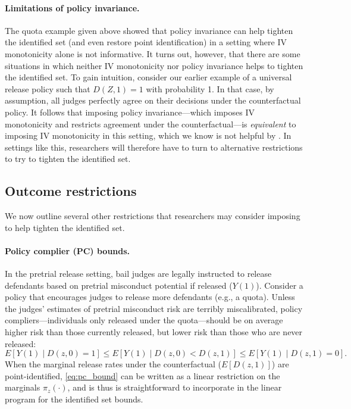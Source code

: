 \documentclass[12pt]{article}%
\theoremstyle{definition}
\newcommand\1{\operatorname{I}\indicatorfence}
\begin{document}
\paragraph{Limitations of policy invariance.} The quota
example given above showed that policy invariance can help tighten the
identified set (and even restore point identification) in a setting where IV monotonicity alone is not informative. It turns out, however, that there are some situations in which neither IV monotonicity nor policy invariance helps to tighten the identified set. To gain intuition, consider our earlier example of a universal release
policy such that $D(Z,1)=1$ with probability 1. In that case, by assumption, all
judges perfectly agree on their decisions under the counterfactual policy. It
follows that imposing policy invariance---which imposes IV monotonicity and
restricts agreement under the counterfactual---is \emph{equivalent} to imposing
IV monotonicity in this setting, which we know is not helpful by
. In settings like this, researchers will therefore have to turn to
alternative restrictions to try to tighten the identified set.

\subsection{Outcome restrictions}\label{sec:outcome_restrictions}
We now outline several other restrictions that researchers may consider imposing to help tighten the identified set.

\paragraph{Policy complier (PC) bounds.} In the pretrial release setting, bail judges are
legally instructed to release defendants based on pretrial misconduct potential
if released ($Y(1)$). Consider a policy that encourages judges to release more
defendants (e.g., a quota). Unless the judges' estimates of pretrial misconduct
risk are terribly miscalibrated, policy
compliers---individuals only released under the quota---should be on average higher
risk than those currently released, but lower risk than those who are never
released:
\begin{equation}\label{eq:pc_bound}
  E[Y(1)\mid D(z,0)=1]\leq E[Y(1)\mid D(z,0)<D(z,1)]\leq E[Y(1)\mid D(z,1)=0].
\end{equation}
When the marginal release rates under the counterfactual ($E[D(z,1)]$) are
point-identified, \cref{eq:pc_bound} can be written as a linear restriction on the
marginals $\pi_{z}(\cdot)$, and is thus is straightforward to incorporate in the
linear program for the identified set bounds.
\end{document}
